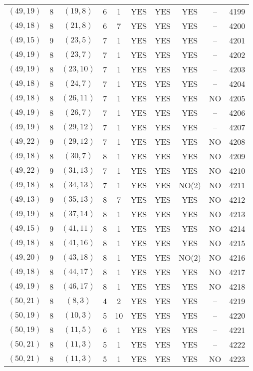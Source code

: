 \begin{longtable}{|c|c|c|c|c|c|c|c|c|c|}
$(49, 19)$ & 8 & $(19, 8)$ & 6 & 1 & YES & YES & YES & -- & 4199\\
$(49, 18)$ & 8 & $(21, 8)$ & 6 & 7 & YES & YES & YES & -- & 4200\\
$(49, 15)$ & 9 & $(23, 5)$ & 7 & 1 & YES & YES & YES & -- & 4201\\
$(49, 19)$ & 8 & $(23, 7)$ & 7 & 1 & YES & YES & YES & -- & 4202\\
$(49, 19)$ & 8 & $(23, 10)$ & 7 & 1 & YES & YES & YES & -- & 4203\\
$(49, 18)$ & 8 & $(24, 7)$ & 7 & 1 & YES & YES & YES & -- & 4204\\
$(49, 18)$ & 8 & $(26, 11)$ & 7 & 1 & YES & YES & YES & NO & 4205\\
$(49, 19)$ & 8 & $(26, 7)$ & 7 & 1 & YES & YES & YES & -- & 4206\\
$(49, 19)$ & 8 & $(29, 12)$ & 7 & 1 & YES & YES & YES & -- & 4207\\
$(49, 22)$ & 9 & $(29, 12)$ & 7 & 1 & YES & YES & YES & NO & 4208\\
$(49, 18)$ & 8 & $(30, 7)$ & 8 & 1 & YES & YES & YES & NO & 4209\\
$(49, 22)$ & 9 & $(31, 13)$ & 7 & 1 & YES & YES & YES & NO & 4210\\
$(49, 18)$ & 8 & $(34, 13)$ & 7 & 1 & YES & YES & NO(2) & NO & 4211\\
$(49, 13)$ & 9 & $(35, 13)$ & 8 & 7 & YES & YES & YES & NO & 4212\\
$(49, 19)$ & 8 & $(37, 14)$ & 8 & 1 & YES & YES & YES & NO & 4213\\
$(49, 15)$ & 9 & $(41, 11)$ & 8 & 1 & YES & YES & YES & NO & 4214\\
$(49, 18)$ & 8 & $(41, 16)$ & 8 & 1 & YES & YES & YES & NO & 4215\\
$(49, 20)$ & 9 & $(43, 18)$ & 8 & 1 & YES & YES & NO(2) & NO & 4216\\
$(49, 18)$ & 8 & $(44, 17)$ & 8 & 1 & YES & YES & YES & NO & 4217\\
$(49, 19)$ & 8 & $(46, 17)$ & 8 & 1 & YES & YES & YES & NO & 4218\\
$(50, 21)$ & 8 & $(8, 3)$ & 4 & 2 & YES & YES & YES & -- & 4219\\
$(50, 19)$ & 8 & $(10, 3)$ & 5 & 10 & YES & YES & YES & -- & 4220\\
$(50, 19)$ & 8 & $(11, 5)$ & 6 & 1 & YES & YES & YES & -- & 4221\\
$(50, 21)$ & 8 & $(11, 3)$ & 5 & 1 & YES & YES & YES & -- & 4222\\
$(50, 21)$ & 8 & $(11, 3)$ & 5 & 1 & YES & YES & YES & NO & 4223\\

\end{longtable}
